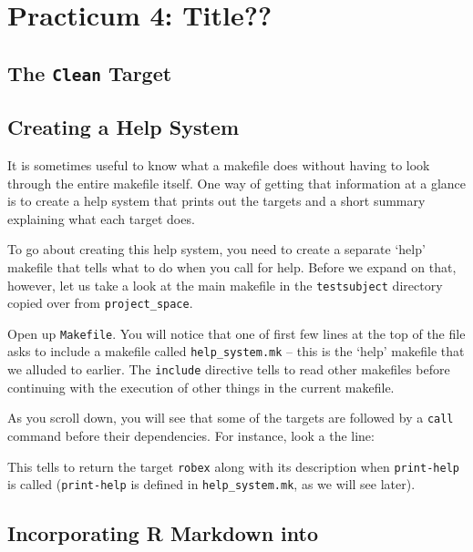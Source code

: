 \chapter*{Practicum 4: Title?? }
\label{sec:practicum4}

\section{The \texttt{Clean} Target}



\section{Creating a \maken{} Help System}
It is sometimes useful to know what a makefile does without having to look through the entire makefile itself. One way of getting that information at a glance is to create a \maken{} help system that prints out the targets and a short summary explaining what each target does. 

To go about creating this help system, you need to create a separate `help' makefile that tells \maken{} what to do when you call for help. Before we expand on that, however, let us take a look at the main makefile in the \texttt{testsubject} directory copied over from \texttt{project_space}.

Open up \texttt{Makefile}. You will notice that one of first few lines at the top of the file asks \maken{} to include a makefile called \texttt{help_system.mk} -- this is the `help' makefile that we alluded to earlier. The \texttt{include} directive tells \maken{} to read other makefiles before continuing with the execution of other things in the current makefile.  

As you scroll down, you will see that some of the targets are followed by a \texttt{call} command before their dependencies. For instance, look a the line:

This tells \maken{} to return the target \texttt{robex} along with its description when \texttt{print-help} is called (\texttt{print-help} is defined in \texttt{help_system.mk}, as we will see later). 



\section{Incorporating R Markdown into \maken{}}



